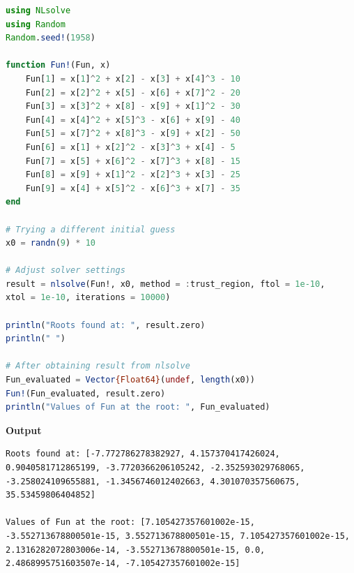 \begin{lstlisting}[language=Julia,style=mystyle]
using NLsolve
using Random
Random.seed!(1958)

function Fun!(Fun, x)
    Fun[1] = x[1]^2 + x[2] - x[3] + x[4]^3 - 10
    Fun[2] = x[2]^2 + x[5] - x[6] + x[7]^2 - 20
    Fun[3] = x[3]^2 + x[8] - x[9] + x[1]^2 - 30
    Fun[4] = x[4]^2 + x[5]^3 - x[6] + x[9] - 40
    Fun[5] = x[7]^2 + x[8]^3 - x[9] + x[2] - 50
    Fun[6] = x[1] + x[2]^2 - x[3]^3 + x[4] - 5
    Fun[7] = x[5] + x[6]^2 - x[7]^3 + x[8] - 15
    Fun[8] = x[9] + x[1]^2 - x[2]^3 + x[3] - 25
    Fun[9] = x[4] + x[5]^2 - x[6]^3 + x[7] - 35
end

# Trying a different initial guess
x0 = randn(9) * 10

# Adjust solver settings
result = nlsolve(Fun!, x0, method = :trust_region, ftol = 1e-10, 
xtol = 1e-10, iterations = 10000)

println("Roots found at: ", result.zero)
println(" ")

# After obtaining result from nlsolve
Fun_evaluated = Vector{Float64}(undef, length(x0))
Fun!(Fun_evaluated, result.zero)
println("Values of Fun at the root: ", Fun_evaluated)
\end{lstlisting}
\textbf{Output} 
\begin{verbatim}
Roots found at: [-7.772786278382927, 4.157370417426024, 0.9040581712865199, -3.7720366206105242, -2.352593029768065, -3.258024109655881, -1.3456746012402663, 4.301070357560675, 35.53459806404852]
 
Values of Fun at the root: [7.105427357601002e-15, -3.552713678800501e-15, 3.552713678800501e-15, 7.105427357601002e-15, 2.1316282072803006e-14, -3.552713678800501e-15, 0.0, 2.4868995751603507e-14, -7.105427357601002e-15]
\end{verbatim}



